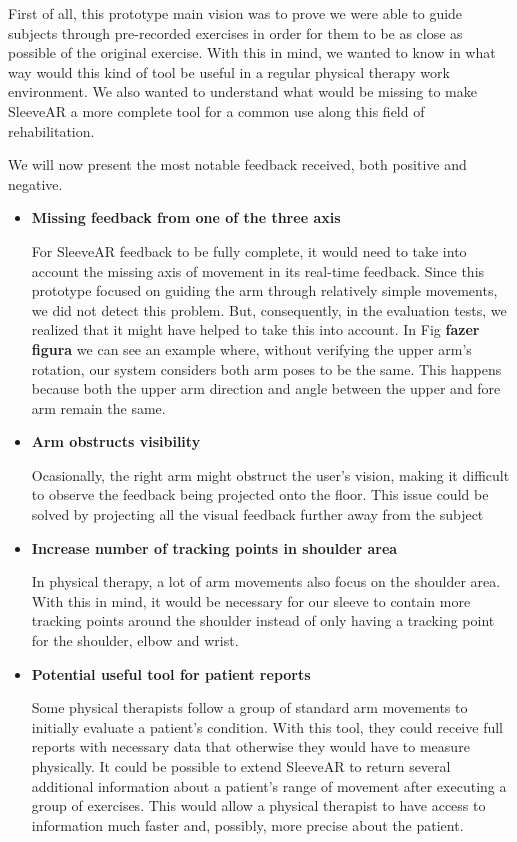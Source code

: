 First of all, this prototype main vision was to prove we were able to guide subjects through pre-recorded exercises in order for them to be as close as possible of the original exercise. With this in mind, we wanted to know in what way would this kind of tool be useful in a regular physical therapy work environment. We also wanted to understand what would be missing to make SleeveAR a more complete tool for a common use along this field of rehabilitation.

We will now present the most notable feedback received, both positive and negative.




\begin{itemize}
\item \textbf{Missing feedback from one of the three axis}

For SleeveAR feedback to be fully complete, it would need to take into account the missing axis of movement in its real-time feedback. Since this prototype focused on guiding the arm through relatively simple movements, we did not detect this problem. But, consequently, in the evaluation tests, we realized that it might have helped to take this into account. In Fig \textbf{fazer figura} we can see an example where, without verifying the upper arm's rotation, our system considers both arm poses to be the same. This happens because both the upper arm direction and angle between the upper and fore arm remain the same.


\item \textbf{Arm obstructs visibility}

Ocasionally, the right arm might obstruct the user's vision, making it difficult to observe the feedback being projected onto the floor. This issue could be solved by projecting all the visual feedback further away from the subject

\item \textbf{Increase number of tracking points in shoulder area}

In physical therapy, a lot of arm movements also focus on the shoulder area. With this in mind, it would be necessary for our sleeve to contain more tracking points around the shoulder instead of only having a tracking point for the shoulder, elbow and wrist.

\item \textbf{Potential useful tool for patient reports}

Some physical therapists follow a group of standard arm movements to initially evaluate a patient's condition. With this tool, they could receive full reports with necessary data that otherwise they would have to measure physically. It could be possible to extend SleeveAR to return several additional information about a patient's range of movement after executing a group of exercises. This would allow a physical therapist to have access to information much faster and, possibly, more precise about the patient. 


\end{itemize}
